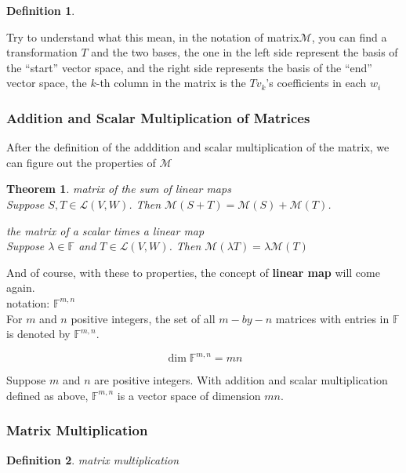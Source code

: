 \documentclass{article}
\newtheorem{theorem}{Theorem}[subsection]
\newtheorem{definition}{Definition}[subsection]
\newcommand{\FF}{\mathbb{F}}
\begin{document}
\begin{CJK}{UTF8}{gkai}
\begin{definition}
\end{definition}

Try to understand what this mean, in the notation of matrix$\mathcal{M}$, you can find a transformation $T$ and the two bases, the one in the left side represent the basis of the ``start'' vector space, and the right side represents the basis of the ``end'' vector space, the $k$-th column in the matrix is the $Tv_k$'s coefficients in each $w_i$\\


\subsubsection{Addition and Scalar Multiplication of Matrices}

After the definition of the adddition and scalar multiplication of the matrix, we can figure out the properties of $\mathcal{M}$ \\

\begin{theorem}
    matrix of the sum of linear maps\\

    Suppose $S,T \in \mathcal{L}(V,W)$. Then $\mathcal{M}(S+T) = \mathcal{M}(S)+\mathcal{M}(T)$.
    
    the matrix of a scalar times a linear map\\

    Suppose $\lambda  \in \FF$ and $T \in \mathcal{L}(V,W)$. Then $\mathcal{M}(\lambda T) = \lambda \mathcal{M}(T)$
    
\end{theorem}

And of course, with these to properties, the concept of \textbf{linear map} will come again.\\

notation: $\FF^{m,n}$\\

For $m$ and $n$ positive integers, the set of all $m-by-n$ matrices with entries in $\FF$ is denoted by $\FF^{m,n}$.

\[\dim\FF^{m,n} = mn\]

Suppose $m$ and $n$ are positive integers. With addition and scalar multiplication defined as above, $\FF^{m,n}$ is a vector space of dimension $mn$.\\

\subsubsection{Matrix Multiplication}
\begin{definition}
    matrix multiplication\\
    

\end{definition}
\end{CJK}
\end{document}
